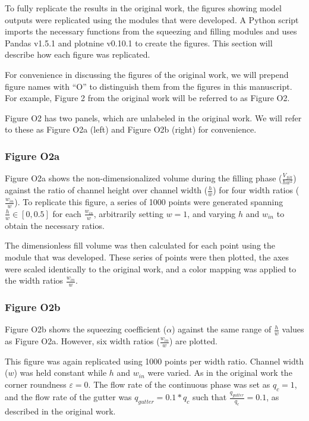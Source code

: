 To fully replicate the results in the original work, the figures showing model outputs were
replicated using the modules that were developed. A Python script imports the necessary
functions from the squeezing and filling modules and uses Pandas\supercite{team_pandas_2020} v1.5.1
and plotnine\supercite{kibirige_plotnine_2022} v0.10.1 to create the figures.
This section will describe how each figure was replicated.

For convenience in discussing the figures of the original work, we will prepend figure names
with “O” to distinguish them from the figures in this manuscript. For example, Figure 2 from
the original work will be referred to as Figure O2.

Figure O2 has two panels, which are unlabeled in the original work. We will refer to these as Figure O2a
(left) and Figure O2b (right) for convenience.

\subsubsection{Figure O2a}

Figure O2a shows the non-dimensionalized volume during the filling phase ($\frac{V_{fill}}{hw^2}$)
against the ratio of channel height over channel width ($\frac{h}{w}$) for four width ratios 
($\frac{w_{in}}{w}$).
To replicate this figure, a series of 1000 points were generated spanning $\frac{h}{w} \in [0,0.5]$
for each $\frac{w_{in}}{w}$, arbitrarily setting $w=1$, and varying $h$ and
$w_{in}$ to obtain the necessary ratios.

The dimensionless fill volume was then calculated for each point using the module that was
developed. These series of points were then plotted, the axes were scaled identically to the
original work, and a color mapping was applied to the width ratios $\frac{w_{in}}{w}$.

\subsubsection{Figure O2b}

Figure O2b shows the squeezing coefficient ($\alpha$) against the same range of $\frac{h}{w}$
values as Figure O2a. However, six width ratios ($\frac{w_{in}}{w}$) are plotted.

This figure was again replicated using 1000 points per width ratio. Channel width ($w$) was
held constant while $h$ and $w_{in}$ were varied. As in the original work the corner roundness
$\varepsilon=0$. The flow rate of the continuous phase was set as $q_c=1$, and the flow rate of the
gutter was $q_{gutter}=0.1*q_c$ such that $\frac{q_{gutter}}{q_c}=0.1$, as described in the original
work.

